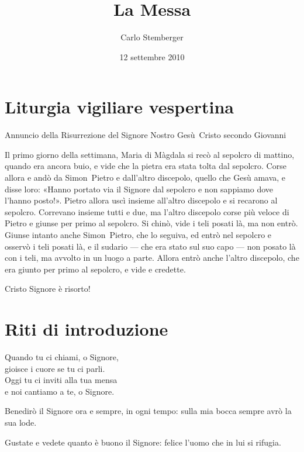 \documentclass[leaflet,rite=ambrosian,litcolor=red,biblerefstyle=CEI]{missa}
\title{La Messa}
\author{Carlo Stemberger}
\date{12 settembre 2010} %
\newcommand{\TODO}{\makecolorbox{green}{\textcolor{red}{TODO}}}
\begin{document}


\section{Liturgia vigiliare vespertina}
\par\TODO

Annuncio della Risurrezione del Signore Nostro Gesù~Cristo secondo Giovanni

Il primo giorno della settimana, Maria di Màgdala si recò al sepolcro di mattino, quando era ancora buio, e vide che la pietra era stata tolta dal sepolcro.
Corse allora e andò da Simon~Pietro e dall'altro discepolo, quello che Gesù amava, e disse loro: «Hanno portato via il Signore dal sepolcro e non sappiamo dove l'hanno posto!».
Pietro allora uscì insieme all'altro discepolo e si recarono al sepolcro.
Correvano insieme tutti e due, ma l'altro discepolo corse più veloce di Pietro e giunse per primo al sepolcro.
Si chinò, vide i teli posati là, ma non entrò.
Giunse intanto anche Simon~Pietro, che lo seguiva, ed entrò nel sepolcro e osservò i teli posati là, e il sudario --- che era stato sul suo capo --- non posato là con i teli, ma avvolto in un luogo a parte.
Allora entrò anche l'altro discepolo, che era giunto per primo al sepolcro, e vide e credette.

Cristo Signore è risorto!

\all{\tbtg[!]}

\section{Riti di introduzione}
\R \hfill \TODO

Quando tu ci chiami, o Signore,\\
gioisce i cuore se tu ci parli.\\
Oggi tu ci inviti alla tua mensa\\
e noi cantiamo a te, o Signore.

Benedirò il Signore ora e sempre, in ogni tempo: sulla mia bocca sempre avrò la sua lode. \R

Gustate e vedete quanto è buono il Signore: felice l'uomo che in lui si rifugia. \R
\end{document}
